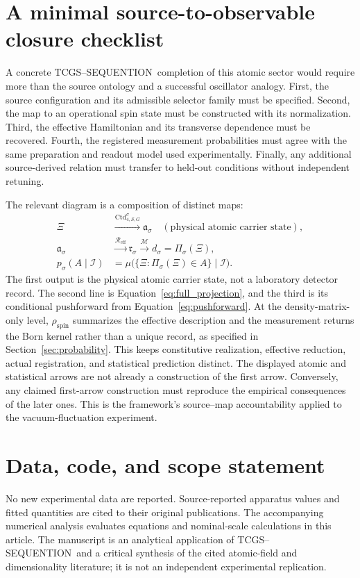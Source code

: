 \documentclass[11pt,a4paper]{article}
\theoremstyle{definition}
\theoremstyle{remark}
\newcommand{\TCGS}{TCGS--SEQUENTION}
\begin{document}
\section{A minimal source-to-observable closure checklist}
\label{app:closure}
A concrete \TCGS\ completion of this atomic sector would require more than the source ontology and a successful oscillator analogy. First, the source configuration and its admissible selector family must be specified. Second, the map to an operational spin state must be constructed with its normalization. Third, the effective Hamiltonian and its transverse dependence must be recovered. Fourth, the registered measurement probabilities must agree with the same preparation and readout model used experimentally. Finally, any additional source-derived relation must transfer to held-out conditions without independent retuning.\cite{foundation}

The relevant diagram is a composition of distinct maps:
\begin{equation}
 \begin{aligned}
 \Xi&\xrightarrow{\mathrm{Ctd}^{\sigma}_{4,S,G}}
 \mathfrak a_\sigma\quad(\text{physical atomic carrier state}),\\
 \mathfrak a_\sigma
 &\xrightarrow{\mathcal R_{\mathrm{eff}}}\mathfrak r_\sigma
 \xrightarrow{\mathcal M}d_\sigma=\Pi_\sigma(\Xi),\\
 p_\sigma(A\mid\mathcal I)
 &=\mu\bigl(\{\Xi:\Pi_\sigma(\Xi)\in A\}\mid\mathcal I\bigr).
 \end{aligned}
 \label{eq:closure_chain}
\end{equation}
The first output is the physical atomic carrier state, not a laboratory detector record. The second line is Equation~\eqref{eq:full_projection}, and the third is its conditional pushforward from Equation~\eqref{eq:pushforward}. At the density-matrix-only level, $\rho_{\mathrm{spin}}$ summarizes the effective description and the measurement returns the Born kernel rather than a unique record, as specified in Section~\ref{sec:probability}. This keeps constitutive realization, effective reduction, actual registration, and statistical prediction distinct.\cite{foundation,born}
The displayed atomic and statistical arrows are not already a construction of the first arrow. Conversely, any claimed first-arrow construction must reproduce the empirical consequences of the later ones. This is the framework's source--map accountability applied to the vacuum-fluctuation experiment.\cite{foundation,planck}

\section*{Data, code, and scope statement}
No new experimental data are reported. Source-reported apparatus values and fitted quantities are cited to their original publications. The accompanying numerical analysis evaluates equations and nominal-scale calculations in this article. The manuscript is an analytical application of \TCGS\ and a critical synthesis of the cited atomic-field and dimensionality literature; it is not an independent experimental replication.
\end{document}
